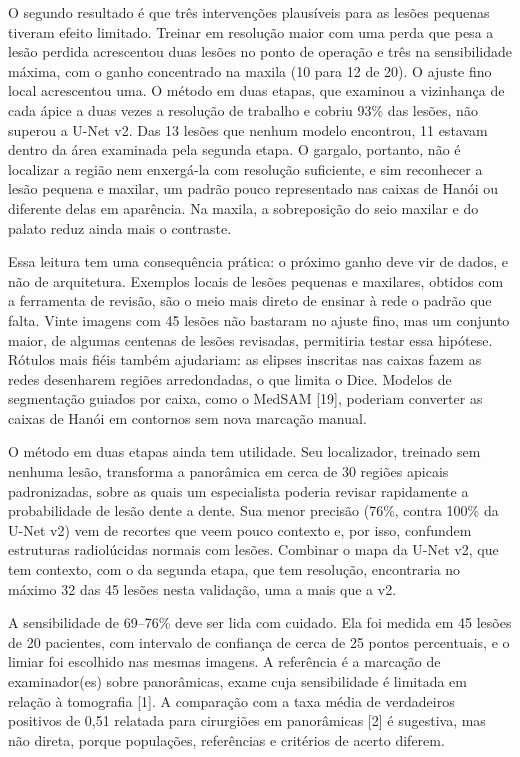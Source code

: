 \documentclass[twocolumn]{article}
\begin{document}
O segundo resultado é que três intervenções plausíveis para as lesões pequenas tiveram efeito limitado. Treinar em resolução maior com uma perda que pesa a lesão perdida acrescentou duas lesões no ponto de operação e três na sensibilidade máxima, com o ganho concentrado na maxila (10 para 12 de 20). O ajuste fino local acrescentou uma. O método em duas etapas, que examinou a vizinhança de cada ápice a duas vezes a resolução de trabalho e cobriu 93\% das lesões, não superou a U-Net v2. Das 13 lesões que nenhum modelo encontrou, 11 estavam dentro da área examinada pela segunda etapa. O gargalo, portanto, não é localizar a região nem enxergá-la com resolução suficiente, e sim reconhecer a lesão pequena e maxilar, um padrão pouco representado nas caixas de Hanói ou diferente delas em aparência. Na maxila, a sobreposição do seio maxilar e do palato reduz ainda mais o contraste.

Essa leitura tem uma consequência prática: o próximo ganho deve vir de dados, e não de arquitetura. Exemplos locais de lesões pequenas e maxilares, obtidos com a ferramenta de revisão, são o meio mais direto de ensinar à rede o padrão que falta. Vinte imagens com 45 lesões não bastaram no ajuste fino, mas um conjunto maior, de algumas centenas de lesões revisadas, permitiria testar essa hipótese. Rótulos mais fiéis também ajudariam: as elipses inscritas nas caixas fazem as redes desenharem regiões arredondadas, o que limita o Dice. Modelos de segmentação guiados por caixa, como o MedSAM [19], poderiam converter as caixas de Hanói em contornos sem nova marcação manual.

O método em duas etapas ainda tem utilidade. Seu localizador, treinado sem nenhuma lesão, transforma a panorâmica em cerca de 30 regiões apicais padronizadas, sobre as quais um especialista poderia revisar rapidamente a probabilidade de lesão dente a dente. Sua menor precisão (76\%, contra 100\% da U-Net v2) vem de recortes que veem pouco contexto e, por isso, confundem estruturas radiolúcidas normais com lesões. Combinar o mapa da U-Net v2, que tem contexto, com o da segunda etapa, que tem resolução, encontraria no máximo 32 das 45 lesões nesta validação, uma a mais que a v2.

A sensibilidade de 69--76\% deve ser lida com cuidado. Ela foi medida em 45 lesões de 20 pacientes, com intervalo de confiança de cerca de 25 pontos percentuais, e o limiar foi escolhido nas mesmas imagens. A referência é a marcação de  examinador(es) sobre panorâmicas, exame cuja sensibilidade é limitada em relação à tomografia [1]. A comparação com a taxa média de verdadeiros positivos de 0,51 relatada para cirurgiões em panorâmicas [2] é sugestiva, mas não direta, porque populações, referências e critérios de acerto diferem.
\end{document}
